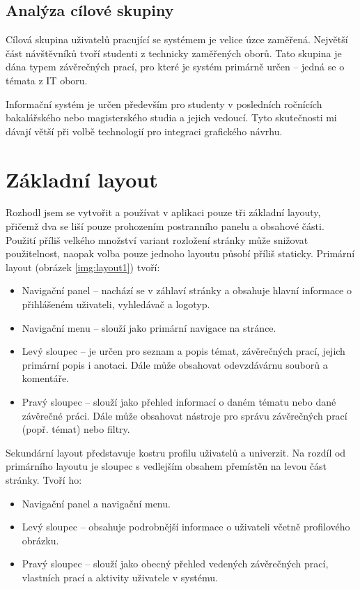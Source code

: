 \subsection{Analýza cílové skupiny}

Cílová skupina uživatelů pracující se systémem je velice úzce zaměřená. Největší část návštěvníků tvoří studenti z technicky zaměřených oborů. Tato skupina je dána typem závěrečných prací, pro které je systém primárně určen -- jedná se o témata z IT oboru.

Informační systém je určen především pro studenty v posledních ročnících bakalářského nebo magisterského studia a jejich vedoucí. Tyto skutečnosti mi dávají větší  při volbě technologií pro integraci grafického návrhu.

\section{Základní layout}

Rozhodl jsem se vytvořit a používat v aplikaci pouze tři základní layouty, přičemž dva se liší pouze prohozením postranního panelu a obsahové části. Použití příliš velkého množství variant rozložení stránky může snižovat použitelnost, naopak volba pouze jednoho layoutu působí příliš staticky. Primární layout (obrázek \ref{img:layout1}) tvoří:

\begin{itemize}
    \item Navigační panel -- nachází se v záhlaví stránky a obsahuje hlavní informace o přihlášeném uživateli, vyhledávač a logotyp.
    \item Navigační menu -- slouží jako primární navigace na stránce.
    \item Levý sloupec -- je určen pro seznam a popis témat, závěrečných prací, jejich primární popis i anotaci. Dále může obsahovat odevzdávárnu souborů a komentáře.
    \item Pravý sloupec -- slouží jako přehled informací o daném tématu nebo dané závěrečné práci. Dále může obsahovat nástroje pro správu závěrečných prací (popř. témat) nebo filtry.
\end{itemize}

Sekundární layout představuje kostru profilu uživatelů a univerzit. Na rozdíl od primárního layoutu je sloupec s vedlejším obsahem přemístěn na levou část stránky. Tvoří ho:

\begin{itemize}
    \item Navigační panel a navigační menu.
    \item Levý sloupec -- obsahuje podrobnější informace o uživateli včetně profilového obrázku.
    \item Pravý sloupec -- slouží jako obecný přehled vedených závěrečných prací, vlastních prací a aktivity uživatele v systému.
\end{itemize}


